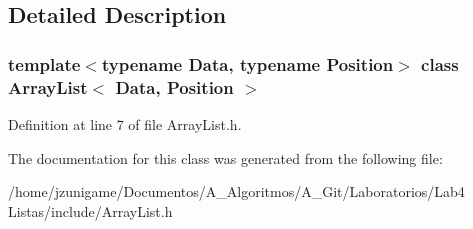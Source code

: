 \subsection{Detailed Description}
\subsubsection*{template$<$typename Data, typename Position$>$\newline
class Array\+List$<$ Data, Position $>$}



Definition at line 7 of file Array\+List.\+h.



The documentation for this class was generated from the following file\+:\begin{DoxyCompactItemize}
\item 
/home/jzunigame/\+Documentos/\+A\+\_\+\+Algoritmos/\+A\+\_\+\+Git/\+Laboratorios/\+Lab4 Listas/include/Array\+List.\+h\end{DoxyCompactItemize}
